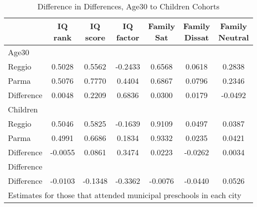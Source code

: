 \begin{table}[htbp]\centering
\caption{Difference in Differences, Age30 to Children Cohorts}
\begin{tabular}{l*{6}{c}}
\hline\hline
            &     IQ rank&    IQ score&   IQ factor&  Family Sat&Family Dissat&Family Neutral\\
\hline
Age30       &            &            &            &            &            &            \\
Reggio      &      0.5028&      0.5562&     -0.2433&      0.6568&      0.0618&      0.2838\\
Parma       &      0.5076&      0.7770&      0.4404&      0.6867&      0.0796&      0.2346\\
Difference  &      0.0048&      0.2209&      0.6836&      0.0300&      0.0179&     -0.0492\\
\hline
Children    &            &            &            &            &            &            \\
Reggio      &      0.5046&      0.5825&     -0.1639&      0.9109&      0.0497&      0.0387\\
Parma       &      0.4991&      0.6686&      0.1834&      0.9332&      0.0235&      0.0421\\
Difference  &     -0.0055&      0.0861&      0.3474&      0.0223&     -0.0262&      0.0034\\
\hline
Difference  &            &            &            &            &            &            \\
Difference  &     -0.0103&     -0.1348&     -0.3362&     -0.0076&     -0.0440&      0.0526\\
\hline\hline
\multicolumn{7}{l}{\footnotesize Estimates for those that attended municipal preschools in each city}\\
\end{tabular}
\end{table}
